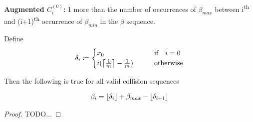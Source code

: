 \begin{definition}
	\textbf{Augmented $C^{(0)}_i$:} 1 more than the number of occurrences of $\beta_{max}$ between i\textsuperscript{th} and (i+1)\textsuperscript{th} occurrence of $\beta_{min}$ in the $\beta$ sequence.
\end{definition}

\begin{theorem}
	Define 
	\begin{align*}
			\delta_i \coloneqq \begin{cases}
				x_0 \qquad &\text{if} \quad i = 0\\
				i (\ceil{\frac{1}{m}} - \frac{1}{m}) \qquad &\text{otherwise}
			\end{cases}
	\end{align*}

	Then the following is true for all valid collision sequences

	\begin{align*}
		\beta_i = \floor{\delta_i} + \beta_{max} - \floor{\delta_{i+1}}
	\end{align*}
\end{theorem}

\begin{proof}
	TODO...
\end{proof}